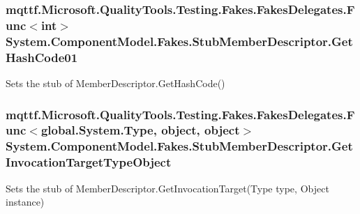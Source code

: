 \hypertarget{class_system_1_1_component_model_1_1_fakes_1_1_stub_member_descriptor_a272524132eff73e087b2dd006c51e176}{
\subsubsection[{Get\-Hash\-Code01}]{\setlength{\rightskip}{0pt plus 5cm}mqttf.\-Microsoft.\-Quality\-Tools.\-Testing.\-Fakes.\-Fakes\-Delegates.\-Func$<$int$>$ System.\-Component\-Model.\-Fakes.\-Stub\-Member\-Descriptor.\-Get\-Hash\-Code01}}\label{class_system_1_1_component_model_1_1_fakes_1_1_stub_member_descriptor_a272524132eff73e087b2dd006c51e176}


Sets the stub of Member\-Descriptor.\-Get\-Hash\-Code()

\hypertarget{class_system_1_1_component_model_1_1_fakes_1_1_stub_member_descriptor_a039c296abd2ef560d893d0dc5d1a46da}{
\subsubsection[{Get\-Invocation\-Target\-Type\-Object}]{\setlength{\rightskip}{0pt plus 5cm}mqttf.\-Microsoft.\-Quality\-Tools.\-Testing.\-Fakes.\-Fakes\-Delegates.\-Func$<$global.\-System.\-Type, object, object$>$ System.\-Component\-Model.\-Fakes.\-Stub\-Member\-Descriptor.\-Get\-Invocation\-Target\-Type\-Object}}\label{class_system_1_1_component_model_1_1_fakes_1_1_stub_member_descriptor_a039c296abd2ef560d893d0dc5d1a46da}


Sets the stub of Member\-Descriptor.\-Get\-Invocation\-Target(\-Type type, Object instance)

